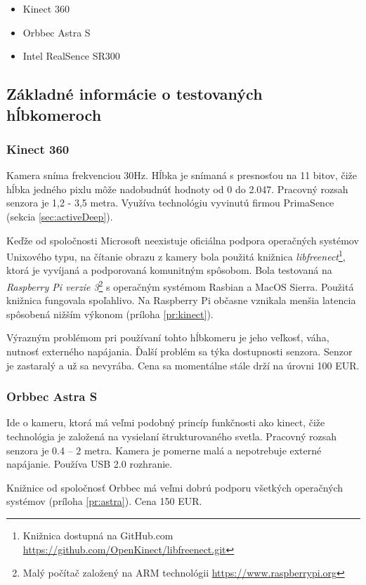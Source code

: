 \begin{itemize}
\item Kinect 360
\item Orbbec Astra S
\item Intel RealSence SR300

\end{itemize}


\subsection{Základné informácie o testovaných hĺbkomeroch}
\subsubsection{Kinect 360}
Kamera sníma frekvenciou 30Hz. Hĺbka je snímaná s presnosťou na 11 bitov, čiže hĺbka jedného pixlu môže nadobudnúť hodnoty od 0 do 2.047.  Pracovný rozsah senzora je  1,2 - 3,5 metra.  Využíva technológiu vyvinutú firmou PrimaSence (sekcia \ref{sec:activeDeep}).

Keďže od spoločnosti Microsoft neexistuje oficiálna podpora operačných systémov Unixového typu, na čítanie obrazu z kamery bola použitá knižnica \textit{libfreenect}\footnote{Knižnica dostupná na GitHub.com \url{https://github.com/OpenKinect/libfreenect.git}}, ktorá je vyvíjaná a podporovaná komunitným spôsobom. Bola testovaná na \textit{Raspberry Pi verzie 3}\footnote{Malý počítač založený na ARM technológii \url{https://www.raspberrypi.org}} s operačným systémom Rasbian a MacOS Sierra. Použitá knižnica fungovala spoľahlivo. Na Raspberry Pi občasne vznikala menšia latencia spôsobená nižším výkonom (príloha \ref{pr:kinect}).

Výrazným problémom pri používaní tohto hĺbkomeru je jeho veľkosť, váha, nutnosť externého napájania. Ďalší problém sa týka dostupnosti senzora. Senzor je zastaralý a už sa nevyrába. Cena sa momentálne stále drží na úrovni 100 EUR. 

\subsubsection{Orbbec Astra S}
Ide o kameru, ktorá má veľmi podobný princíp funkčnosti ako kinect, čiže technológia je založená na vysielaní štrukturovaného svetla. Pracovný rozsah senzora je 0.4 – 2 metra. Kamera je pomerne malá a nepotrebuje externé napájanie. Používa USB 2.0 rozhranie. 

Knižnice od spoločnosť Orbbec má veľmi dobrú podporu všetkých operačných systémov (príloha \ref{pr:astra}). Cena 150 EUR. 


